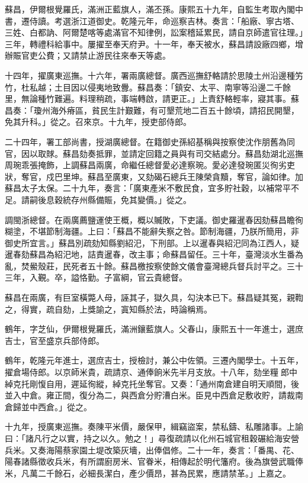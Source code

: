 \begin{pinyinscope}
蘇昌，伊爾根覺羅氏，滿洲正藍旗人，滿丕孫。康熙五十九年，自監生考取內閣中書，遷侍讀。考選浙江道御史。乾隆元年，命巡察吉林。奏言：「船廠、寧古塔、三姓、白都訥、阿爾楚喀等處滿官不知律例，訟案稽延累民，請自京師遣官往理。」三年，轉禮科給事中。屢擢至奉天府尹。十一年，奉天被水，蘇昌請設廠四鄉，增辦賑官吏公費；又請禁止游民往來奉天等處。

十四年，擢廣東巡撫。十六年，署兩廣總督。廣西巡撫舒輅請於思陵土州沿邊種竻竹，杜私越；土目因以侵夷地致釁。蘇昌奏：「鎮安、太平、南寧等沿邊二千餘里，無論種竹難遍。料理稍疏，事端轉啟，請更正。」上責舒輅輕率，寢其事。蘇昌奏：「瓊州海外瘠區，貧民生計艱難，有可墾荒地二百五十餘頃，請招民開墾，免其升科。」從之。召來京。十九年，授吏部侍郎。

二十四年，署工部尚書，授湖廣總督。在籍御史孫紹基稱與按察使沈作朋舊為同官，因以取賕。蘇昌劾奏抵罪，並請定回籍之員與有司交結處分。蘇昌劾湖北巡撫周琬乖張掩飾，上調蘇昌兩廣，命繼任總督愛必達察琬。愛必達發琬匿災徇劣吏狀，奪官，戍巴里坤。蘇昌至廣東，又劾碣石總兵王陳榮貪黷，奪官，論如律。加蘇昌太子太保。二十九年，奏言：「廣東產米不敷民食，宜多貯社穀，以補常平不足。請嗣後息穀統存州縣備賑，免其變價。」從之。

調閩浙總督。在兩廣薦鹽運使王概，概以贓敗，下吏議。御史羅暹春因劾蘇昌瞻徇糊塗，不堪節制海疆。上曰：「蘇昌不能辭失察之咎。節制海疆，乃朕所簡用，非御史所宜言。」蘇昌別疏劾知縣劉紹汜，下刑部。上以暹春與紹汜同為江西人，疑暹春劾蘇昌為紹汜地，詰責暹春，改主事；命蘇昌留任。三十年，臺灣淡水生番為亂，焚鱟殼莊，民死者五十餘。蘇昌檄按察使餘文儀會臺灣總兵督兵討平之。三十三年，入覲。卒，謚恪勤。子富綱，官云貴總督。

蘇昌在兩廣，有巨室橫斃人母，誣其子，獄久具，勾決本已下。蘇昌疑其冤，親鞫之，得實，疏自劾，上獎諭之，寘知縣於法，時論稱焉。

鶴年，字芝仙，伊爾根覺羅氏，滿洲鑲藍旗人。父春山，康熙五十一年進士，選庶吉士，官至盛京兵部侍郎。

鶴年，乾隆元年進士，選庶吉士，授檢討，兼公中佐領。三遷內閣學士。十五年，擢倉場侍郎。以京師米貴，疏請京、通俸餉米先半月支放。十八年，劾坐糧郎中綽克托剛愎自用，遲延徇縱，綽克托坐奪官。又奏：「通州南倉建自明天順間，後並入中倉。雍正間，復分為二，與西倉分貯漕白米。臣見中西倉足敷收貯，請裁南倉歸並中西倉。」從之。

十九年，授廣東巡撫。奏陳平米價，嚴保甲，緝竊盜案，禁私鑄、私雕諸事。上諭曰：「諸凡行之以實，持之以久。勉之！」尋復疏請以化州石城官租穀碾給海安營兵米。又奏海陽蔡家園土堤改築灰墻，出俸倡修。二十一年，奏言：「番禺、花、陽春諸縣徵收兵米，有所謂廚房米、官眷米，相傳起於明代籓府。後為旗營武職俸米，凡萬二千餘石，必細長潔白，產少價昂，甚為民累，應請禁革。」上嘉之。


\end{pinyinscope}
